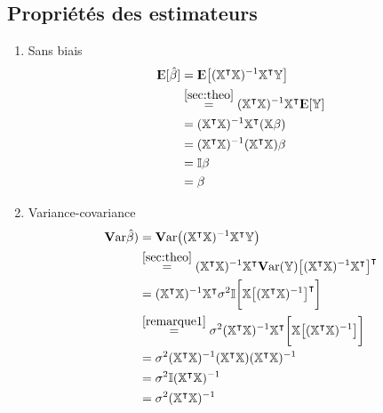 \documentclass[11pt,french]{report}
\newcommand{\E}{{\rm I\kern-.3em E}}
\newcommand{\Var}{\mathrm{\textbf{V}ar}}
\begin{document}
\subsection*{Propriétés des estimateurs}
\begin{enumerate}
\item Sans biais
\begin{align*}
\E[\hat{\beta}] &= \E\big[ (\mathbb{X}^\intercal\mathbb{X})^{-1}\mathbb{X}^\intercal\mathbb{Y} \big] \\
&\overset{\ref{sec:theo}}{=} (\mathbb{X}^\intercal\mathbb{X})^{-1}\mathbb{X}^\intercal \E[\mathbb{Y}] \\
&= (\mathbb{X}^\intercal\mathbb{X})^{-1}\mathbb{X}^\intercal (\mathbb{X}\beta) \\
&= (\mathbb{X}^\intercal\mathbb{X})^{-1}(\mathbb{X}^\intercal\mathbb{X}) \beta \\
&= \mathbb{I} \beta \\
&= \beta \\
\end{align*}
\item Variance-covariance
\begin{align*}
\Var\hat{\beta}) &= \Var\big((\mathbb{X}^\intercal\mathbb{X})^{-1}\mathbb{X}^\intercal\mathbb{Y} \big) \\
&\overset{\ref{sec:theo}}{=} (\mathbb{X}^\intercal\mathbb{X})^{-1}\mathbb{X}^\intercal \Var(\mathbb{Y}) \big[ (\mathbb{X}^\intercal\mathbb{X})^{-1}\mathbb{X}^\intercal \big]^\intercal \\
&= (\mathbb{X}^\intercal\mathbb{X})^{-1}\mathbb{X}^\intercal \sigma^2 \mathbb{I} \bigg[ \mathbb{X} \big[(\mathbb{X}^\intercal\mathbb{X})^{-1} \big]^\intercal \bigg] \\
& \overset{\ref{remarque1}}{=}\sigma^2 (\mathbb{X}^\intercal\mathbb{X})^{-1} \mathbb{X}^\intercal \bigg[ \mathbb{X} \big[(\mathbb{X}^\intercal\mathbb{X})^{-1} \big] \bigg] \\
&= \sigma^2 (\mathbb{X}^\intercal\mathbb{X})^{-1} (\mathbb{X}^\intercal\mathbb{X}) (\mathbb{X}^\intercal\mathbb{X})^{-1} \\
&= \sigma^2 \mathbb{I} (\mathbb{X}^\intercal\mathbb{X})^{-1} \\
&= \sigma^2 (\mathbb{X}^\intercal\mathbb{X})^{-1} \\
\end{align*}
\end{enumerate}
\end{document}
